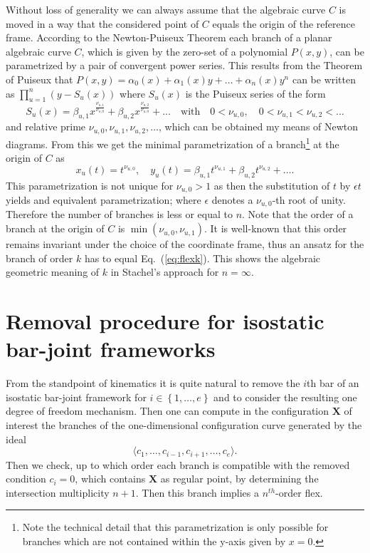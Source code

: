 \documentclass{svproc}
\def\Vkt#1{{\mathbf #1}}
\begin{document}
Without loss of generality we can always assume that the algebraic curve $C$ is moved in a way that 
the considered point of $C$ equals the origin of the reference frame. 
According to the Newton-Puiseux Theorem each branch of a planar algebraic curve $C$, which is given by the zero-set of a polynomial $P(x,y)$, 
can be parametrized by a pair of convergent power series. 
This results from the Theorem of Puiseux that  $P(x,y)=\alpha_{0}(x)+\alpha_{1}(x)y+\ldots +\alpha_{n}(x)y^{n}$ 
can be written as 
$\prod_{u=1}^{n}(y-S_{u}(x))$ where $S_{u}(x)$ is the Puiseux series of the form 
\begin{equation}
S_{u}(x)= \beta_{u,1}x^{\tfrac{\nu_{u,1}}{\nu_{u,0}}}+\beta_{u,2}x^{\tfrac{\nu_{u,2}}{\nu_{u,0}}}+\ldots \quad \text{with}\quad 0<\nu_{u,0},\quad 0<\nu_{u,1}<\nu_{u,2}<\ldots
\end{equation}
and relative prime $\nu_{u,0},\nu_{u,1},\nu_{u,2},\ldots$, which 
can be obtained my means of Newton diagrams.
From this we get the minimal parametrization %
of a branch\footnote{\label{fn1}Note the technical detail that 
this parametrization is only possible for branches which are not contained within the y-axis given by $x=0$.} at the origin of 
 $C$ as
\begin{equation}
x_{u}(t)=t^{\nu_{u,0}}, \quad y_{u}(t)= \beta_{u,1}t^{\nu_{u,1}}+ \beta_{u,2}t^{\nu_{u,2}}+\ldots .
\end{equation} 
This parametrization is not unique for $\nu_{u,0}>1$ as then the substitution of $t$ by $\epsilon t$ yields and 
equivalent parametrization; where $\epsilon$ denotes a $\nu_{u,0}$-th root of unity. 
Therefore the number of branches is less or equal to $n$.
Note that the order of a branch at the origin of $C$ is  $\min(\nu_{u,0},\nu_{u,1})$. 
It is well-known that this order remains invariant under the choice of the coordinate frame, thus an 
ansatz for the branch of order $k$ has to equal Eq.\ (\ref{eq:flexk}). 
This shows the algebraic geometric meaning of $k$ in Stachel's approach for  $n=\infty$. 




\section{Removal procedure for isostatic bar-joint frameworks}\label{sec:removal}


From the standpoint of kinematics it is quite natural to remove the $i$th bar of an isostatic bar-joint framework for $i\in\left\{1,\ldots, e\right\}$
and to consider the resulting one degree of freedom mechanism.  Then one can compute in the configuration $\Vkt X$ of interest  
the branches of the one-dimensional configuration curve generated by the ideal 
\begin{equation}\label{ideal:basic}
\langle c_1,\ldots,c_{i-1},c_{i+1},\ldots,c_e\rangle. 
\end{equation}
Then we check, up to which order each branch is compatible with the removed condition $c_i=0$, which contains $\Vkt X$ as regular point,  by determining the intersection multiplicity $n+1$. 
Then this branch implies a $n^{th}$-order flex. 
\end{document}
